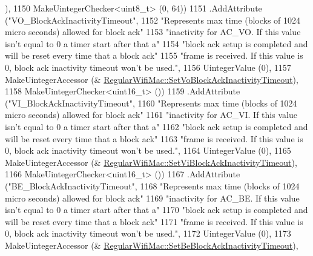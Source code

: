 \begin{DoxyCode}
      ),
1150                    MakeUintegerChecker<uint8\_t> (0, 64))
1151     .AddAttribute (\textcolor{stringliteral}{"VO\_BlockAckInactivityTimeout"},
1152                    \textcolor{stringliteral}{"Represents max time (blocks of 1024 micro seconds) allowed for block ack"}
1153                    \textcolor{stringliteral}{"inactivity for AC\_VO. If this value isn't equal to 0 a timer start after that a"}
1154                    \textcolor{stringliteral}{"block ack setup is completed and will be reset every time that a block ack"}
1155                    \textcolor{stringliteral}{"frame is received. If this value is 0, block ack inactivity timeout won't be used."},
1156                    UintegerValue (0),
1157                    MakeUintegerAccessor (&
      \hyperlink{classns3_1_1RegularWifiMac_aeec8938ddaee57cb8c324a210a901774}{RegularWifiMac::SetVoBlockAckInactivityTimeout}),
1158                    MakeUintegerChecker<uint16\_t> ())
1159     .AddAttribute (\textcolor{stringliteral}{"VI\_BlockAckInactivityTimeout"},
1160                    \textcolor{stringliteral}{"Represents max time (blocks of 1024 micro seconds) allowed for block ack"}
1161                    \textcolor{stringliteral}{"inactivity for AC\_VI. If this value isn't equal to 0 a timer start after that a"}
1162                    \textcolor{stringliteral}{"block ack setup is completed and will be reset every time that a block ack"}
1163                    \textcolor{stringliteral}{"frame is received. If this value is 0, block ack inactivity timeout won't be used."},
1164                    UintegerValue (0),
1165                    MakeUintegerAccessor (&
      \hyperlink{classns3_1_1RegularWifiMac_a479eaca73aac3245cf4107bc45e323ce}{RegularWifiMac::SetViBlockAckInactivityTimeout}),
1166                    MakeUintegerChecker<uint16\_t> ())
1167     .AddAttribute (\textcolor{stringliteral}{"BE\_BlockAckInactivityTimeout"},
1168                    \textcolor{stringliteral}{"Represents max time (blocks of 1024 micro seconds) allowed for block ack"}
1169                    \textcolor{stringliteral}{"inactivity for AC\_BE. If this value isn't equal to 0 a timer start after that a"}
1170                    \textcolor{stringliteral}{"block ack setup is completed and will be reset every time that a block ack"}
1171                    \textcolor{stringliteral}{"frame is received. If this value is 0, block ack inactivity timeout won't be used."},
1172                    UintegerValue (0),
1173                    MakeUintegerAccessor (&
      \hyperlink{classns3_1_1RegularWifiMac_a4590e73681af3c4de72c6ec32abdd015}{RegularWifiMac::SetBeBlockAckInactivityTimeout}),

\end{DoxyCode}
